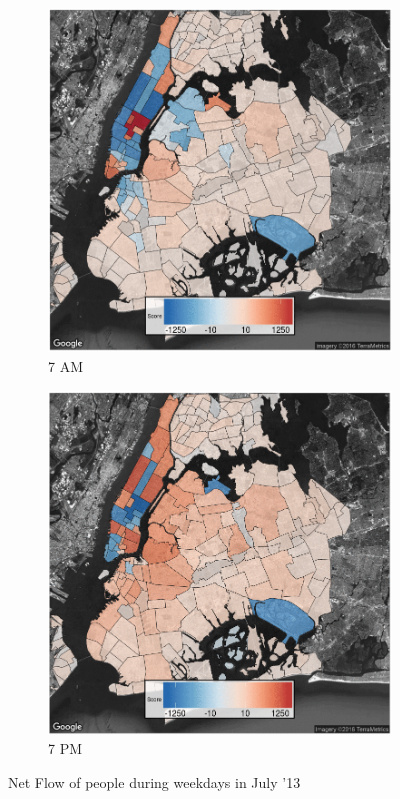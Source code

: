 \documentclass[twocolumn]{article}
\begin{document}
\begin{figure}[t]
\begin{subfigure}{0.24\textwidth}
\centering
 \includegraphics[width=1\linewidth]{7am} 
 \caption{7 AM}
 \label{fig:7am}
\end{subfigure}
 \begin{subfigure}{0.24\textwidth}
 \centering
\includegraphics[width=1\linewidth]{7pm}
 \caption{7 PM} 
 \label{fig:7pm}
\end{subfigure}
 
\caption{Net Flow of people during weekdays in July '13}
\label{fig:flow}
\end{figure}
\end{document}
